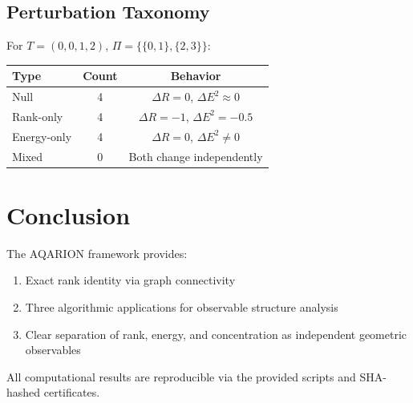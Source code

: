 \documentclass[11pt]{article}
\theoremstyle{definition}
\begin{document}
\subsection{Perturbation Taxonomy}

For $T = (0,0,1,2)$, $\Pi = \{\{0,1\},\{2,3\}\}$:
\begin{center}
\begin{tabular}{lcc}
\toprule
Type & Count & Behavior \\
\midrule
Null & 4 & $\Delta R = 0$, $\Delta E^2 \approx 0$ \\
Rank-only & 4 & $\Delta R = -1$, $\Delta E^2 = -0.5$ \\
Energy-only & 4 & $\Delta R = 0$, $\Delta E^2 \neq 0$ \\
Mixed & 0 & Both change independently \\
\bottomrule
\end{tabular}
\end{center}

\section{Conclusion}

The AQARION framework provides:
\begin{enumerate}
\item Exact rank identity via graph connectivity
\item Three algorithmic applications for observable structure analysis
\item Clear separation of rank, energy, and concentration as independent geometric observables
\end{enumerate}

All computational results are reproducible via the provided scripts and SHA-hashed certificates.
\end{document}

